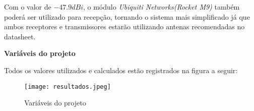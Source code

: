 Com o valor de $-47.9dBi$, o módulo \textit{Ubiquiti Networks(Rocket M9)} também poderá ser utilizado para recepção, tornando o sistema mais simplificado já que ambos receptores e transmissores estarão utilizando antenas recomendadas no datasheet.

\newpage
\begin{center}
	\Large \textbf{Variáveis do projeto}
\end{center}
Todos os valores utilizados e calculados estão registrados na figura a seguir:
\begin{figure}[h]
	\centering
	\texttt{[image: resultados.jpeg]}
	\label{fig:result}
	\caption{Variáveis do projeto}
\end{figure} 


